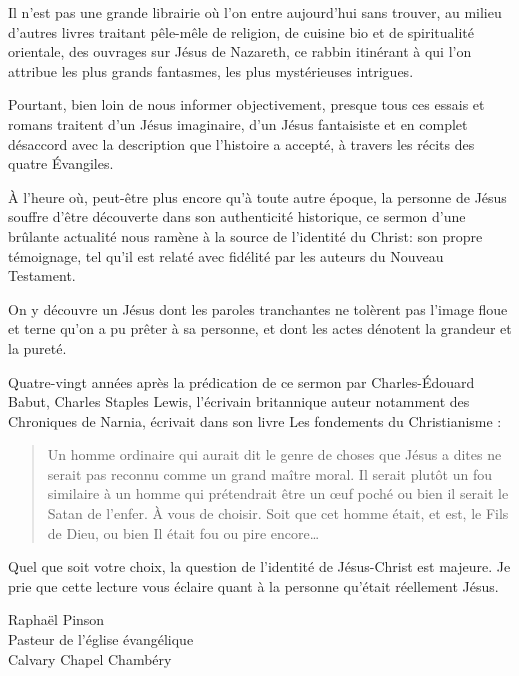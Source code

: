 
\begin{preface}
Il n'est pas une grande librairie où l'on entre aujourd'hui sans trouver,
au milieu d'autres livres traitant pêle-mêle de religion, de cuisine bio et de spiritualité orientale,
des ouvrages sur Jésus de Nazareth, ce rabbin itinérant à qui l'on attribue les plus grands
fantasmes, les plus mystérieuses intrigues.

Pourtant, bien loin de nous informer objectivement, presque tous ces essais et romans
traitent d'un Jésus imaginaire, d'un Jésus fantaisiste et en complet désaccord avec
la description que l'histoire a accepté, à travers les récits des quatre \'Evangiles.

\`A l'heure où, peut-être plus encore qu'à toute autre époque, la personne de Jésus
souffre d'être découverte dans son authenticité historique, ce sermon d'une brûlante actualité
nous ramène à la source de l'identité du Christ: son propre témoignage,
tel qu'il est relaté avec fidélité par les auteurs du Nouveau Testament.

On y découvre un Jésus dont les paroles tranchantes ne tolèrent pas l'image
floue et terne qu'on a pu prêter à sa personne,
et dont les actes dénotent la grandeur et la pureté.

Quatre-vingt années après la prédication de ce sermon par Charles-\'Edouard Babut, Charles Staples Lewis, l'écrivain britannique auteur notamment des Chroniques de Narnia, écrivait dans son livre \Og Les fondements du Christianisme \Fg{}:

\begin{quote}
\quotefont
Un homme ordinaire qui aurait dit le genre de choses que Jésus
a dites ne serait pas reconnu comme un grand maître moral.
Il serait plutôt un fou \ocadr similaire à un homme qui prétendrait être un œuf poché \fcadr ou bien il serait le Satan de l'enfer.
À vous de choisir. Soit que cet homme était, et est, le Fils de Dieu, ou bien Il était fou ou pire encore…
\end{quote}


Quel que soit votre choix, la question de l'identité de Jésus-Christ est majeure. Je prie que cette lecture vous éclaire quant à la personne qu'était réellement Jésus.


\begin{flushright}
Raphaël Pinson\\
Pasteur de l'église évangélique\\
Calvary Chapel Chambéry
\end{flushright}

\end{preface}


